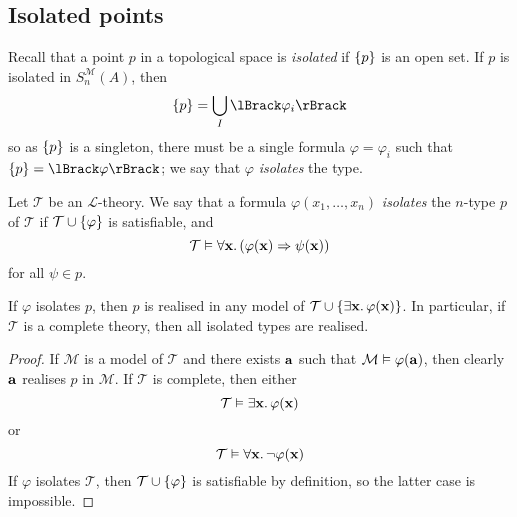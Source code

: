 \subsection{Isolated points}
Recall that a point \( p \) in a topological space is \emph{isolated} if \( \qty{p} \) is an open set.
If \( p \) is isolated in \( S_n^{\mathcal M}(A) \), then
\[ \qty{p} = \bigcup_I \lBrack\varphi_i\rBrack \]
so as \( \qty{p} \) is a singleton, there must be a single formula \( \varphi = \varphi_i \) such that \( \qty{p} = \lBrack\varphi\rBrack \); we say that \( \varphi \) \emph{isolates} the type.
\begin{definition}
    Let \( \mathcal T \) be an \( \mathcal L \)-theory.
    We say that a formula \( \varphi(x_1, \dots, x_n) \) \emph{isolates} the \( n \)-type \( p \) of \( \mathcal T \) if \( \mathcal T \cup \qty{\varphi} \) is satisfiable, and
    \[ \mathcal T \vDash \forall \vb x.\, (\varphi(\vb x) \Rightarrow \psi(\vb x)) \]
    for all \( \psi \in p \).
\end{definition}
\begin{proposition}
    If \( \varphi \) isolates \( p \), then \( p \) is realised in any model of \( \mathcal T \cup \qty{\exists \vb x.\, \varphi(\vb x)} \).
    In particular, if \( \mathcal T \) is a complete theory, then all isolated types are realised.
\end{proposition}
\begin{proof}
    If \( \mathcal M \) is a model of \( \mathcal T \) and there exists \( \vb a \) such that \( \mathcal M \vDash \varphi(\vb a) \), then clearly \( \vb a \) realises \( p \) in \( \mathcal M \).
    If \( \mathcal T \) is complete, then either
    \[ \mathcal T \vDash \exists \vb x.\, \varphi(\vb x) \]
    or
    \[ \mathcal T \vDash \forall \vb x.\, \neg \varphi(\vb x) \]
    If \( \varphi \) isolates \( \mathcal T \), then \( \mathcal T \cup \qty{\varphi} \) is satisfiable by definition, so the latter case is impossible.
\end{proof}


